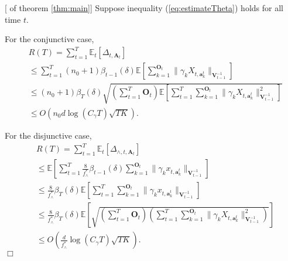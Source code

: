 \documentclass{article}
\newcommand{\EE}{\mathbb{E}}
\newcommand{\bA}{\mathbf{A}}
\newcommand{\ba}{\mathbf{a}}
\newcommand{\bO}{\mathbf{O}}
\newcommand{\bV}{\mathbf{V}}
\newcommand{\norm}[1]{\| #1 \|}
\newenvironment{proof}{\noindent {\textbf{Proof. }}}{$\Box$ \medskip}
\begin{document}
\begin{proof}[ of theorem \ref{thm:main}]
Suppose inequality (\ref{eq:estimateTheta}) holds for all time $t$. 

For the conjunctive case,
\begin{equation}
\begin{split}
&R(T) =\sum_{t=1}^{T} \EE_{t}[\Delta_{t, \bA_t}] \\
&\leq \sum_{t=1}^{T} (n_0 + 1) \beta_{t-1}(\delta) \EE[\sum_{k=1}^{\bO_t}\norm{\gamma_k X_{t,\ba_k^t}}_{\bV_{t-1}^{-1}}]\\
&\leq (n_0 + 1) \beta_T(\delta) \sqrt{(\sum_{t=1}^{T} \bO_t) \EE[\sum_{t=1}^{T} \sum_{k=1}^{\bO_t}\norm{\gamma_k X_{t,\ba_k^t}}_{\bV_{t-1}^{-1}}^2]}  \\
&\leq O(n_0 d \log(C_\gamma T)\sqrt{TK}).
\end{split}
\end{equation}

For the disjunctive case, 
\begin{equation}
\begin{split}
&R(T) =\sum_{t=1}^{T} \EE_{t}[\Delta_{\wedge, t, \bA_t}] \\
&\leq \EE[\sum_{t=1}^{T} \frac{8}{f_{\wedge}^{\ast}} \beta_{t-1}(\delta)\sum_{k=1}^{\bO_t}\norm{\gamma_k x_{t,\ba_k^t}}_{\bV_{t-1}^{-1}}] \\
&\leq \frac{8}{f_{\wedge}^{\ast}} \beta_{T}(\delta) \EE[\sum_{t=1}^{T} \sum_{k=1}^{\bO_t}\norm{\gamma_k x_{t,\ba_k^t}}_{\bV_{t-1}^{-1}}]\\
&\leq \frac{8}{f_{\wedge}^{\ast}} \beta_{T}(\delta) \EE[\sqrt{(\sum_{t=1}^{T} \bO_t) (\sum_{t=1}^{T} \sum_{k=1}^{\bO_t}\norm{\gamma_k X_{t,\ba_k^t}}_{\bV_{t-1}^{-1}}^2)}]\\
&\leq O(\frac{d}{f_{\wedge}^{\ast}}\log(C_\gamma T)\sqrt{TK}).
\end{split}
\end{equation}
\end{proof}
	
	
	


	
\end{document}
